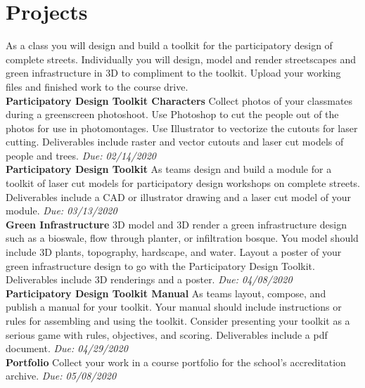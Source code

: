 \documentclass[11pt,article,oneside]{memoir}
\begin{document}
\section{Projects}
As a class you will design and build a toolkit
for the participatory design of complete streets.
Individually you will design, model and render
streetscapes and green infrastructure in 3D
to compliment to the toolkit.
Upload your working files and finished work to the course drive.\\

\noindent \textbf{Participatory Design Toolkit Characters}
Collect photos of your classmates
during a greenscreen photoshoot. 
Use Photoshop to cut the people out of the photos 
for use in photomontages.
Use Illustrator to vectorize the cutouts 
for laser cutting.
Deliverables include raster and vector cutouts 
and laser cut models of people and trees.
\emph{Due: 02/14/2020}\\

\noindent \textbf{Participatory Design Toolkit}
As teams design and build a module for a toolkit of laser cut models
for participatory design workshops on complete streets.
Deliverables include a CAD or illustrator drawing
and a laser cut model of your module.
\emph{Due: 03/13/2020}\\

\noindent \textbf{Green Infrastructure}
3D model and 3D render a green infrastructure design
such as a bioswale, flow through planter, or infiltration bosque.
You model should include 3D plants, topography, hardscape, and water.
Layout a poster of your green infrastructure design
to go with the Participatory Design Toolkit.
Deliverables include 3D renderings and a poster.
\emph{Due: 04/08/2020}\\

\noindent \textbf{Participatory Design Toolkit Manual}
As teams layout, compose, and publish 
a manual for your toolkit. 
Your manual should include instructions or rules
for assembling and using the toolkit. 
Consider presenting your toolkit as a serious game
with rules, objectives, and scoring.
Deliverables include a pdf document.
\emph{Due: 04/29/2020}\\

\noindent \textbf{Portfolio}
Collect your work in a course portfolio
for the school's accreditation archive.
\emph{Due: 05/08/2020}\\
\end{document}
